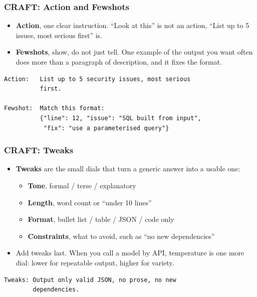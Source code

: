 \begin{frame}[fragile]\frametitle{CRAFT: Action and Fewshots}

\begin{itemize}
    \item \textbf{Action}, one clear instruction. ``Look at this'' is not an action, ``List up to 5 issues, most serious first'' is.
    \item \textbf{Fewshots}, show, do not just tell. One example of the output you want often does more than a paragraph of description, and it fixes the format.
\end{itemize}

\begin{lstlisting}[language=HTML]
Action:   List up to 5 security issues, most serious
          first.

Fewshot:  Match this format:
          {"line": 12, "issue": "SQL built from input",
           "fix": "use a parameterised query"}
\end{lstlisting}

\end{frame}

\begin{frame}[fragile]\frametitle{CRAFT: Tweaks}

\begin{itemize}
    \item \textbf{Tweaks} are the small dials that turn a generic answer into a usable one:
    \begin{itemize}
        \item \textbf{Tone}, formal / terse / explanatory
        \item \textbf{Length}, word count or ``under 10 lines''
        \item \textbf{Format}, bullet list / table / JSON / code only
        \item \textbf{Constraints}, what to avoid, such as ``no new dependencies''
    \end{itemize}
    \item Add tweaks last. When you call a model by API, temperature is one more dial: lower for repeatable output, higher for variety.
\end{itemize}

\begin{lstlisting}[language=HTML]
Tweaks: Output only valid JSON, no prose, no new
        dependencies.
\end{lstlisting}

\end{frame}

